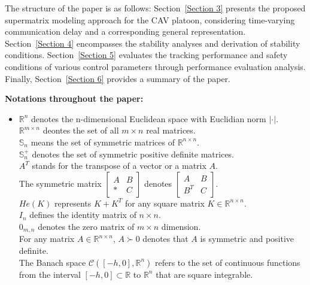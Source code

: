 \documentclass[journal]{IEEEtran}
\begin{document}
The structure of the paper is as follows: Section~\ref{Section 3} presents the proposed supermatrix modeling approach for the CAV platoon, considering time-varying communication delay and a corresponding general representation. Section~\ref{Section 4} encompasses the stability analyses and derivation of stability conditions. Section~\ref{Section 5} evaluates the tracking performance and safety conditions of various control parameters through performance evaluation analysis. Finally, Section~\ref{Section 6} provides a summary of the paper.

\textbf{Notations throughout the paper:} 
\begin{itemize}
  \item[]
${\mathbb{R}^n}$ denotes the n-dimensional Euclidean space with Euclidian norm $| \cdot |$. \\
${\mathbb{R}^{m \times n}}$ deontes the set of all $m \times n$ real matrices. \\
$ {\mathbb{S}_n} $ means the set of symmetric matrices of ${\mathbb{R}^{n \times n}}$.\\
$\mathbb{S}_n^ + $ denotes the set of symmetric positive definite matrices.\\
${A^T} $ stands for the transpose of a vector or a matrix $A $.\\
The symmetric matrix $\left[ {\begin{array}{*{20}{c}}
  A & B \\
  * & C
\end{array}} \right]$ denotes $\left[ {\begin{array}{*{20}{c}}
  A       & B \\
  {{B^T}} & C
\end{array}} \right]$. \\
$ He\left( K \right)$ represents $K + {K^T}$ for any square matrix $ K \in {\mathbb{R}^{n \times n}}$.\\
${I_n} $ defines the identity matrix of $ n \times n $.\\
${0_{m,n}} $ denotes the zero matrix of $ m \times n$ dimension. \\
For any matrix $A \in {\mathbb{R}^{n \times n}} $, $ A \succ 0$ denotes that $A $ is symmetric and positive definite.\\
The Banach space $\mathcal{C}\left( {\left[ { - h,0} \right],{\mathbb{R}^n}} \right)$ refers to the set of continuous functions from the interval $\left[ { - h,0} \right] \subset \mathbb{R}$ to ${\mathbb{R}^n}$ that are square integrable. \\

\end{itemize}
\end{document}
